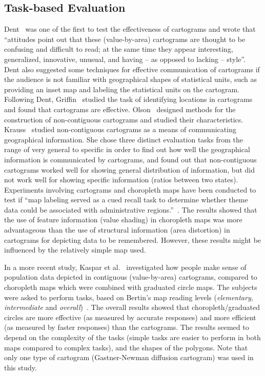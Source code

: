 \documentclass{egpubl}
\begin{document}
\subsection{Task-based Evaluation}

Dent~\cite{dent1975} was one of the first to test the effectiveness of cartograms and wrote that ``attitudes point out that these (value-by-area) cartograms are thought to be confusing and difficult to read; at the same time they appear interesting, generalized, innovative, unusual, and having -- as opposed to lacking -- style''. 
Dent also suggested some techniques for effective communication of cartograms if the audience is not familiar with geographical shapes of statistical units, such as providing an inset map and labeling the statistical units on the cartogram.
Following Dent, Griffin~\cite{Gri83} studied the task of identifying locations in cartograms and found that cartograms are effective. Olson~\cite{Olson} designed methods for the construction of non-contiguous cartograms and studied their characteristics. Krauss~\cite{Krauss_ms} studied non-contiguous cartograms  as a means of communicating geographical information. She chose three distinct evaluation tasks from the range of very general to specific in order to find out how well the geographical information is communicated by cartograms, and found out that non-contiguous cartograms worked well for showing general distribution of information, but did not work well
for showing specific information (ratios between two states). Experiments involving cartograms and choropleth maps have been conducted to test if ``map labeling served as a cued recall task to determine whether theme data could be associated with administrative regions.''~\cite{rittschof1994comparing, rittschof1998learning}. The results showed that the use of feature information (value shading) in choropleth maps was more advantageous than the use of structural information (area distortion) in cartograms for depicting data to be remembered. However, these results might be influenced by the relatively simple map used.



In a more recent study, Kaspar et al.~\cite{kaspar2013empirical} investigated how people make sense of population data depicted in contiguous (value-by-area) cartograms, compared to choropleth maps which were combined with graduated circle maps. The subjects were asked to perform tasks, based on Bertin's map reading levels (\textit{elementary}, \textit{intermediate} and \textit{overall})~\cite{BERTIN83}. The overall results showed that choropleth/graduated circles are more effective (as measured by accurate responses) and more efficient (as measured by faster responses) than the cartograms.
The results seemed to depend on the complexity of the tasks (simple tasks are easier to perform in both maps compared to complex tasks), and the shapes of the polygons. Note that only one type of cartogram (Gastner-Newman diffusion cartogram) was used in this study.
\end{document}
